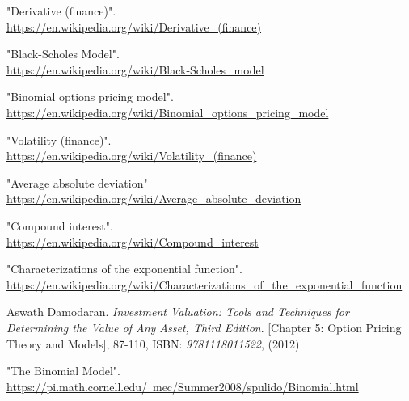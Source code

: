 \documentclass[12pt, letterpaper]{article}
\begin{document}
\begin{thebibliography}{9}
    "Derivative (finance)".
    \\
    \href{https://en.wikipedia.org/wiki/Derivative\_(finance)}{https://en.wikipedia.org/wiki/Derivative\_(finance)}

    "Black-Scholes Model".
    \\
    \href{https://en.wikipedia.org/wiki/Black-Scholes\_model}{https://en.wikipedia.org/wiki/Black-Scholes\_model}

    "Binomial options pricing model".
    \\
    \href{https://en.wikipedia.org/wiki/Binomial\_options\_pricing\_model}{https://en.wikipedia.org/wiki/Binomial\_options\_pricing\_model}

    "Volatility (finance)".
    \\
    \href{https://en.wikipedia.org/wiki/Volatility\_(finance)}{https://en.wikipedia.org/wiki/Volatility\_(finance)}

    "Average absolute deviation"
    \\
    \href{https://en.wikipedia.org/wiki/Average\_absolute\_deviation}{https://en.wikipedia.org/wiki/Average\_absolute\_deviation}

    "Compound interest". \\
    \href{https://en.wikipedia.org/wiki/Compound\_interest}{https://en.wikipedia.org/wiki/Compound\_interest}

    "Characterizations of the exponential function". \\
    \href{https://en.wikipedia.org/wiki/Characterizations\_of\_the\_exponential\_function}{https://en.wikipedia.org/wiki/Characterizations\_of\_the\_exponential\_function}
  
    Aswath Damodaran.
    \textit{Investment Valuation: Tools and Techniques for Determining the Value of Any Asset, Third Edition}.
    [Chapter 5: Option Pricing Theory and Models], 87-110,
    ISBN: \textit{9781118011522},
    (2012)

    "The Binomial Model".
    \href{https://pi.math.cornell.edu/~mec/Summer2008/spulido/Binomial.html}{https://pi.math.cornell.edu/~mec/Summer2008/spulido/Binomial.html}


\end{thebibliography}
\end{document}
